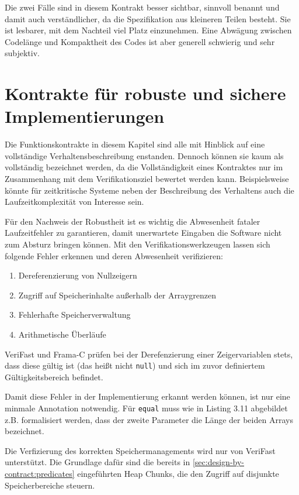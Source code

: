 Die zwei Fälle sind in diesem Kontrakt besser sichtbar, sinnvoll benannt und damit auch verständlicher, 
da die Spezifikation aus kleineren Teilen besteht. Sie ist lesbarer, mit dem Nachteil viel Platz einzunehmen.
Eine Abwägung zwischen Codelänge und Kompaktheit des Codes ist aber generell schwierig und sehr subjektiv.


\section{Kontrakte für robuste und sichere Implementierungen}
\label{sec:design-by-contract:partielle-korrektheit}

Die Funktionskontrakte in diesem Kapitel sind alle mit Hinblick auf eine vollständige Verhaltensbeschreibung
enstanden. Dennoch können sie kaum als vollständig bezeichnet werden, da die Vollständigkeit eines Kontraktes
nur im Zusammenhang mit dem Verifikationsziel bewertet werden kann. Beispielsweise könnte für zeitkritische
Systeme neben der Beschreibung des Verhaltens auch die Laufzeitkomplexität von Interesse sein.

Für den Nachweis der Robustheit ist es wichtig die Abwesenheit fataler Laufzeitfehler zu garantieren,
damit unerwartete Eingaben die Software nicht zum Absturz bringen können. Mit den Verifikationswerkzeugen lassen 
sich folgende Fehler erkennen und deren Abwesenheit verifizieren:
\begin{enumerate}
\item Dereferenzierung von Nullzeigern
\item Zugriff auf Speicherinhalte außerhalb der Arraygrenzen
\item Fehlerhafte Speicherverwaltung
\item Arithmetische Überläufe
\end{enumerate}

VeriFast und Frama-C prüfen bei der Derefenzierung einer Zeigervariablen stets, dass diese gültig ist (das heißt
nicht \texttt{null}) und sich im zuvor definiertem Gültigkeitsbereich befindet. 

Damit diese Fehler in der Implementierung erkannt werden können, ist nur eine minmale Annotation notwendig. 
Für \texttt{equal} muss wie in Listing 3.11 abgebildet z.B. formalisiert werden, dass der zweite Parameter die 
Länge der beiden Arrays bezeichnet. 



Die Verfizierung des korrekten Speichermanagements wird nur von VeriFast unterstützt. Die Grundlage dafür
sind die bereits in \ref{sec:design-by-contract:predicates} eingeführten Heap Chunks, die den Zugriff auf disjunkte 
Speicherbereiche steuern.

